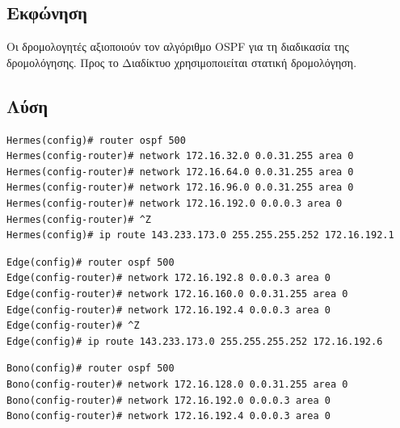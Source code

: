 \documentclass{assignment}
\begin{document}
\subsection*{Εκφώνηση}

Οι δρομολογητές αξιοποιούν τον αλγόριθμο OSPF για τη διαδικασία της δρομολόγησης. 
Προς το Διαδίκτυο χρησιμοποιείται στατική δρομολόγηση.

\subsection*{Λύση}

\begin{verbatim}
Hermes(config)# router ospf 500
Hermes(config-router)# network 172.16.32.0 0.0.31.255 area 0
Hermes(config-router)# network 172.16.64.0 0.0.31.255 area 0
Hermes(config-router)# network 172.16.96.0 0.0.31.255 area 0
Hermes(config-router)# network 172.16.192.0 0.0.0.3 area 0
Hermes(config-router)# ^Z
Hermes(config)# ip route 143.233.173.0 255.255.255.252 172.16.192.1
\end{verbatim}

\begin{verbatim}
Edge(config)# router ospf 500
Edge(config-router)# network 172.16.192.8 0.0.0.3 area 0
Edge(config-router)# network 172.16.160.0 0.0.31.255 area 0
Edge(config-router)# network 172.16.192.4 0.0.0.3 area 0
Edge(config-router)# ^Z
Edge(config)# ip route 143.233.173.0 255.255.255.252 172.16.192.6
\end{verbatim}

\begin{verbatim}
Bono(config)# router ospf 500
Bono(config-router)# network 172.16.128.0 0.0.31.255 area 0
Bono(config-router)# network 172.16.192.0 0.0.0.3 area 0
Bono(config-router)# network 172.16.192.4 0.0.0.3 area 0
\end{verbatim}

 \label{Βιβλιογραφία}



\newpage
\end{document}
